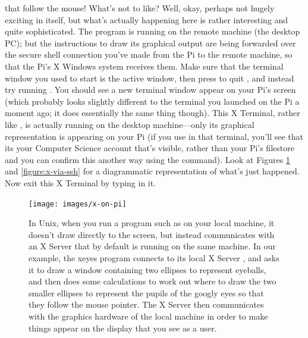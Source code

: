  that follow the mouse! What's not
to like? Well, okay, perhaps not hugely exciting in itself, but what's
actually happening here is rather interesting and quite
sophisticated. The  program is running on the
remote machine (the desktop PC); but the instructions to draw its
graphical output are being forwarded over the secure shell connection
you've made from the Pi to the remote machine, so that the Pi's X
Windows system receives them. Make sure that the terminal window you
used to start  is the active window, then press
 to quit , and instead try running
. You should see a new terminal window appear on
your Pi's screen (which probably looks slightly different to the
terminal you launched on the Pi a moment ago; it does essentially the
same thing though). This X Terminal, rather like ,
is actually running on the desktop machine---only its graphical
representation is appearing on your Pi (if you use  in
that terminal, you'll see that its your Computer Science account
that's visible, rather than your Pi's filestore and you can confirm
this another way using the  command). Look at
Figures \ref{figure:x-on-pi} and \ref{figure:x-via-ssh} for a
diagrammatic representation of what's just happened. Now exit this X
Terminal by typing  in it.

\begin{figure}
\centerline{\texttt{[image: images/x-on-pi]}}
\caption{In Unix, when you run a program such as  on your local machine, it doesn't draw directly to the screen, but instead communicates with an X Server that by default is running on the same machine. In our example, the xeyes program \protect{} connects to its local X Server \protect{}, and asks it to draw a window containing two ellipses to represent eyeballs, and then does some calculations to work out where to draw the two smaller ellipses to represent the pupils of the googly eyes so that they follow the mouse pointer. The X Server then communicates with the graphics hardware of the local machine in order to make things appear on the display that you see as a user. }\label{figure:x-on-pi}
\end{figure}


